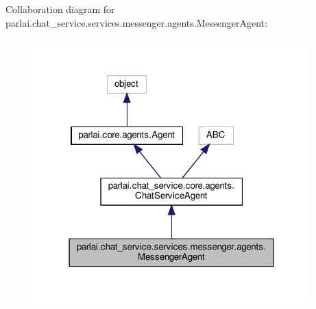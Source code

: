Collaboration diagram for parlai.\+chat\+\_\+service.\+services.\+messenger.\+agents.\+Messenger\+Agent\+:
\nopagebreak
\begin{figure}[H]
\begin{center}
\leavevmode
\includegraphics[width=304pt]{dc/d52/classparlai_1_1chat__service_1_1services_1_1messenger_1_1agents_1_1MessengerAgent__coll__graph}
\end{center}
\end{figure}
